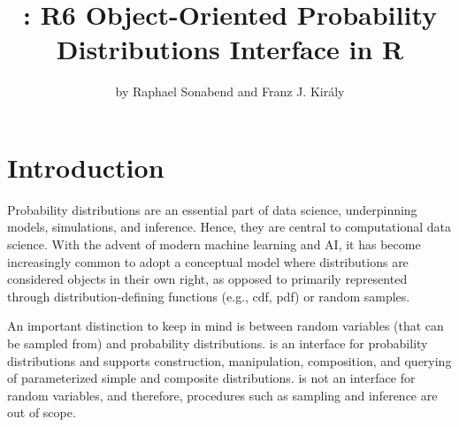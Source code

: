 \title{: R6 Object-Oriented Probability Distributions Interface in R}
\author{by Raphael Sonabend and Franz J. Kir\'aly}

\maketitle



\section{Introduction}
\label{sec:tools_distr6_intro}
Probability distributions are an essential part of data science, underpinning models, simulations, and inference. Hence, they are central to computational data science. With the advent of modern machine learning and AI, it has become increasingly common to adopt a conceptual model where distributions are considered objects in their own right, as opposed to primarily represented through distribution-defining functions (e.g., cdf, pdf) or random samples.

An important distinction to keep in mind is between random variables (that can be sampled from) and probability distributions.  is an interface for probability distributions and supports construction, manipulation, composition, and querying of parameterized simple and composite distributions.  is not an interface for random variables, and therefore, procedures such as sampling and inference are out of scope.

